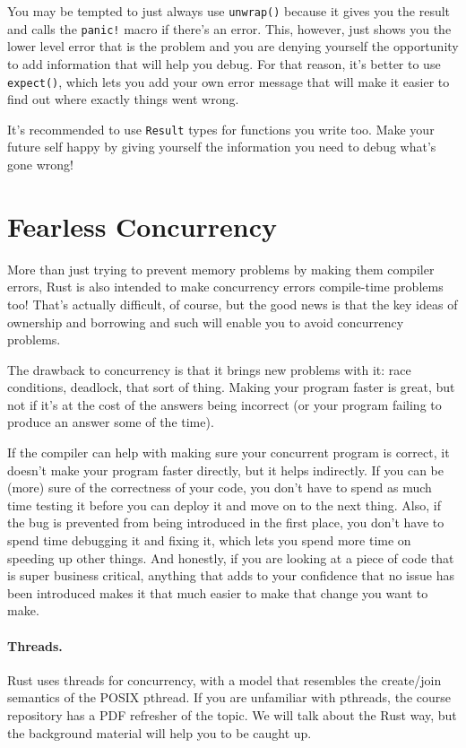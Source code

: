 You may be tempted to just always use \texttt{unwrap()} because it gives you the result and calls the \texttt{panic!} macro if there's an error. This, however, just shows you the lower level error that is the problem and you are denying yourself the opportunity to add information that will help you debug. For that reason, it's better to use \texttt{expect()}, which lets you add your own error message that will make it easier to find out where exactly things went wrong.

It's recommended to use \texttt{Result} types for functions you write too. Make your future self happy by giving yourself the information you need to debug what's gone wrong!

\section*{Fearless Concurrency}
More than just trying to prevent memory problems by making them compiler errors, Rust is also intended to make concurrency errors compile-time problems too! That's actually difficult, of course, but the good news is that the key ideas of ownership and borrowing and such will enable you to avoid concurrency problems.

The drawback to concurrency is that it brings new problems with it: race conditions, deadlock, that sort of thing. Making your program faster is great, but not if it's at the cost of the answers being incorrect (or your program failing to produce an answer some of the time).

If the compiler can help with making sure your concurrent program is correct, it doesn't make your program faster directly, but it helps indirectly. If you can be (more) sure of the correctness of your code, you don't have to spend as much time testing it before you can deploy it and move on to the next thing. Also, if the bug is prevented from being introduced in the first place, you don't have to spend time debugging it and fixing it, which lets you spend more time on speeding up other things. And honestly, if you are looking at a piece of code that is super business critical, anything that adds to your confidence that no issue has been introduced makes it that much easier to make that change you want to make.

\paragraph{Threads.} Rust uses threads for concurrency, with a model that resembles the create/join semantics of the POSIX pthread. If you are unfamiliar with pthreads, the course repository has a PDF refresher of the topic. We will talk about the Rust way, but the background material will help you to be caught up.

